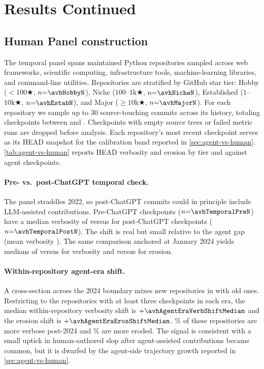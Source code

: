\section{Results Continued}\label{sec:human-repo-panel}




\subsection{Human Panel construction}

The temporal panel spans \avhPanelN{} maintained Python repositories sampled across web frameworks, scientific computing, infrastructure tools, machine-learning libraries, and command-line utilities. Repositories are stratified by GitHub star tier: Hobby ($<100\bigstar$, $n{=}\avhHobbyN$), Niche ($100$--$1\text{k}\bigstar$, $n{=}\avhNicheN$), Established ($1$--$10\text{k}\bigstar$, $n{=}\avhEstabN$), and Major ($\geq10\text{k}\bigstar$, $n{=}\avhMajorN$). For each repository we sample up to 30 source-touching commits across its history, totaling \avhTemporalCkpts{} checkpoints between \avhPanelStartYear{} and \avhPanelEndYear{}. Checkpoints with empty source trees or failed metric runs are dropped before analysis. Each repository's most recent checkpoint serves as its HEAD snapshot for the calibration band reported in \autoref{sec:agent-vs-human}. \autoref{tab:agent-vs-human} reports HEAD verbosity and erosion by tier and against agent checkpoints.


\paragraph{Pre- vs.\ post-ChatGPT temporal check.} The panel straddles 2022, so post-ChatGPT commits could in principle include LLM-assisted contributions. Pre-ChatGPT checkpoints ($n{=}\avhTemporalPreN$) have a median verbosity of \avhTemporalPreVerbMedian{} versus \avhTemporalPostVerbMedian{} for post-ChatGPT checkpoints ($n{=}\avhTemporalPostN$). The shift is real but small relative to the agent gap (mean verbosity \avhAgentVerbMean{}). The same comparison anchored at January 2024 yields medians of \avhAgentEraPreVerbMedian{} versus \avhAgentEraPostVerbMedian{} for verbosity and \avhAgentEraPreErosMedian{} versus \avhAgentEraPostErosMedian{} for erosion.

\paragraph{Within-repository agent-era shift.} A cross-section across the 2024 boundary mixes new repositories in with old ones. Restricting to the \avhAgentEraBothN{} repositories with at least three checkpoints in each era, the median within-repository verbosity shift is $+\avhAgentEraVerbShiftMedian$ and the erosion shift is $+\avhAgentEraErosShiftMedian$. \avhAgentEraVerbHigherPct{}\% of these repositories are more verbose post-2024 and \avhAgentEraErosHigherPct{}\% are more eroded. The signal is consistent with a small uptick in human-authored slop after agent-assisted contributions became common, but it is dwarfed by the agent-side trajectory growth reported in \autoref{sec:agent-vs-human}.

